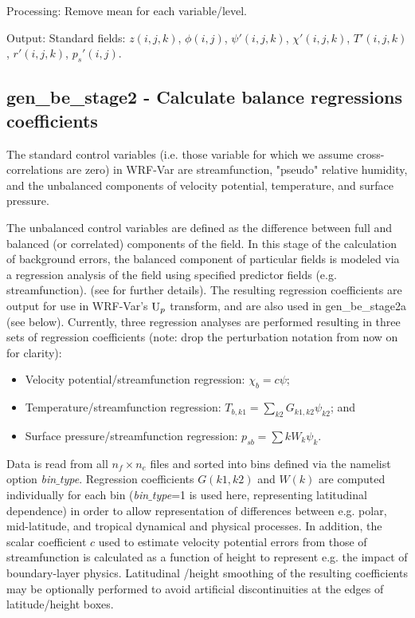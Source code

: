 Processing: Remove mean for each variable/level.

Output: Standard fields: $z(i,j,k)$, $\phi(i,j)$, $\psi'(i,j,k)$, $\chi'(i,j,k)$, 
$T'(i,j,k)$, $r'(i,j,k)$, $p_s'(i,j)$.

\subsection{gen\_be\_stage2 - Calculate balance regressions coefficients}

The standard control variables (i.e. those variable for which we assume cross-correlations are zero) in WRF-Var are streamfunction, "pseudo" relative humidity, and the unbalanced components of velocity potential, temperature, and surface pressure.

The unbalanced control variables are defined as the difference between full and balanced (or correlated) components of the field. In this stage of the calculation of background errors, the balanced component of particular fields is modeled via a regression analysis of the field using specified predictor fields (e.g. streamfunction). (see \citet{wu02} for further details). The resulting regression coefficients are output for use in WRF-Var's ${\rm U}_p$ transform, and are also used in gen\_be\_stage2a (see below). Currently, three regression analyses are performed resulting in three sets of regression coefficients (note: drop the perturbation notation from now on for clarity):


\begin{itemize}\setlength{\parskip}{-4pt}
\item   Velocity potential/streamfunction regression: $\chi_b=c\psi$;
\item	Temperature/streamfunction regression: $T_{b,k1}=\sum_{k2}G_{k1,k2}\psi_{k2}$; and
\item	Surface pressure/streamfunction regression: $p_{sb}=\sum{k}W_{k}\psi_{k}$.
\end{itemize}

Data is read from all $n_f \times n_e$ files and sorted into bins defined via the namelist option {\it bin$\_$type}. Regression coefficients $G(k1,k2)$ and $W(k)$ are computed individually for each bin ({\it bin$\_$type}=1 is used here, representing latitudinal dependence) in order to allow representation of differences between e.g. polar, mid-latitude, and tropical dynamical and physical processes. In addition, the scalar coefficient $c$ used to estimate velocity potential errors from those of streamfunction is calculated as a function of height to represent e.g. the impact of boundary-layer physics. Latitudinal /height smoothing of the resulting coefficients may be optionally performed to avoid artificial discontinuities at the edges of latitude/height boxes.

